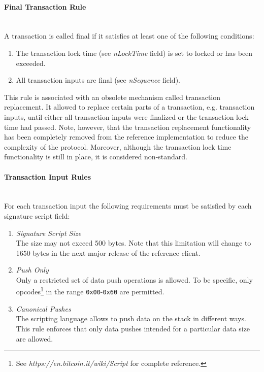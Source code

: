 \paragraph{Final Transaction Rule}\label{sec:FinalTransaction}~\\
A transaction is called final if it satisfies at least one of the following conditions:
\begin{enumerate}[label=\arabic*), leftmargin=1cm]
\item The transaction lock time (see \textit{nLockTime} field) is set to locked or has been exceeded.
\item All transaction inputs are final (see \textit{nSequence} field).
\end{enumerate}

\noindent
This rule is associated with an obsolete mechanism called transaction replacement. It allowed to replace certain parts of a transaction, e.g. transaction inputs, until either all transaction inputs were finalized or the transaction lock time had passed. Note, however, that the transaction replacement functionality has been completely removed from the reference implementation to reduce the complexity of the protocol. Moreover, although the transaction lock time functionality is still in place, it is considered non-standard.

\paragraph{Transaction Input Rules}~\\
For each transaction input the following requirements must be satisfied by each signature script field:
\begin{enumerate}[label=\arabic*), leftmargin=1cm]
\item \textit{Signature Script Size}~\\The size may not exceed 500 bytes. Note that this limitation will change to 1650 bytes in the next major release of the reference client.
\item \textit{Push Only}~\\Only a restricted set of data push operations is allowed. To be specific, only opcodes\footnote{See \textit{https://en.bitcoin.it/wiki/Script} for complete reference.} in the range \texttt{0x00}-\texttt{0x60} are permitted.
\item \textit{Canonical Pushes}~\\The scripting language allows to push data on the stack in different ways. This rule enforces that only data pushes intended for a particular data size are allowed.
\end{enumerate}

